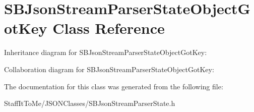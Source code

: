 \hypertarget{interface_s_b_json_stream_parser_state_object_got_key}{
\section{\-S\-B\-Json\-Stream\-Parser\-State\-Object\-Got\-Key \-Class \-Reference}
\label{interface_s_b_json_stream_parser_state_object_got_key}
}


\-Inheritance diagram for \-S\-B\-Json\-Stream\-Parser\-State\-Object\-Got\-Key\-:


\-Collaboration diagram for \-S\-B\-Json\-Stream\-Parser\-State\-Object\-Got\-Key\-:


\-The documentation for this class was generated from the following file\-:\begin{DoxyCompactItemize}
\item 
\-Staff\-It\-To\-Me/\-J\-S\-O\-N\-Classes/\-S\-B\-Json\-Stream\-Parser\-State.\-h\end{DoxyCompactItemize}
